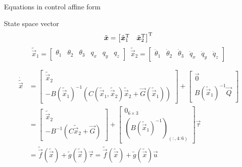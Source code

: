 \begin{frame}{Equations in control affine form}
  \begin{block}{State space vector}
    \[
    \tilde{\boldsymbol{x}} =
    \begin{bmatrix}
      \tilde{\boldsymbol{x}}_1^{\mathrm{T}} & \tilde{\boldsymbol{x}}_2^{\mathrm{T}}
    \end{bmatrix}^{\mathrm{T}}
    \]
    \[
    \tilde{\vec{x}}_1 = 
    \begin{bmatrix}
      \theta_1 & \theta_2 & \theta_3 & q_x & q_y & q_z
    \end{bmatrix}
    \enspace
    \tilde{\vec{x}}_2 = 
    \begin{bmatrix}
      \dot{\theta}_1 & \dot{\theta}_2 & \dot{\theta}_3 & \dot{q}_x & \dot{q}_y & \dot{q}_z
    \end{bmatrix}
    \]
  \end{block}
  \[
  \begin{split}
    \dot{\tilde{\vec{x}}} &= 
    \begin{bmatrix}
      \tilde{\vec{x}}_2 \\
      - B({\tilde{\vec{x}}_1}) ^ {-1} (C(\tilde{\vec{x}}_1, \tilde{\vec{x}}_2) \tilde{\vec{x}}_2 + \vec{G}(\tilde{\vec{x}}_1)) 
    \end{bmatrix} +
    \begin{bmatrix}
      \vec{0} \\
      B({\tilde{\vec{x}}_1}) ^ {-1} \vec{Q}
    \end{bmatrix}\\
    &=\begin{bmatrix}
    \tilde{\vec{x}}_2 \\
    - B^ {-1} (C \tilde{\vec{x}}_2 + \vec{G}) 
    \end{bmatrix} +
    \begin{bmatrix}
      0_{6\times3} \\
      \left(B({\tilde{\vec{x}}_1}) ^ {-1}\right)_{(:, 4:6)}
    \end{bmatrix}\vec{\tau}\\
    &= \tilde{\vec{f}}(\tilde{\vec{x}}) + \tilde{g}(\tilde{\vec{x}}) \vec{\tau}
    = \tilde{\vec{f}}(\tilde{\vec{x}}) + \tilde{g}(\tilde{\vec{x}}) \vec{u}
  \end{split}
  \]
\end{frame}

